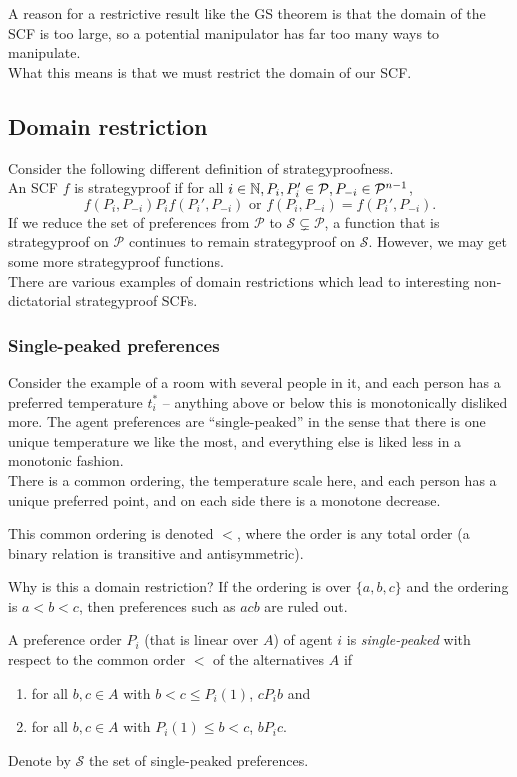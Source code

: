 	A reason for a restrictive result like the GS theorem is that the domain of the SCF is too large, so a potential manipulator has far too many ways to manipulate.\\
	What this means is that we must restrict the domain of our SCF.

\subsection{Domain restriction}

	Consider the following different definition of strategyproofness.\\
	An SCF $f$ is strategyproof if for all $i \in \mathbb{N}, P_i,P_i' \in \mathcal{P}, P_{-i} \in \mathcal{P}^{n-1}$,
	\[ f(P_i,P_{-i}) P_i f(P_i',P_{-i}) \text{ or } f(P_i,P_{-i}) = f(P_i',P_{-i}). \]
	If we reduce the set of preferences from $\mathcal{P}$ to $\mathcal{S} \subsetneq \mathcal{P}$, a function that is strategyproof on $\mathcal{P}$ continues to remain strategyproof on $\mathcal{S}$. However, we may get some more strategyproof functions.\\

	There are various examples of domain restrictions which lead to interesting non-dictatorial strategyproof SCFs.

	\subsubsection{Single-peaked preferences}
		Consider the example of a room with several people in it, and each person has a preferred temperature $t_i^*$ -- anything above or below this is monotonically disliked more. The agent preferences are ``single-peaked'' in the sense that there is one unique temperature we like the most, and everything else is liked less in a monotonic fashion.\\
		There is a common ordering, the temperature scale here, and each person has a unique preferred point, and on each side there is a monotone decrease. %

		This common ordering is denoted $<$, where the order is any total order (a binary relation is transitive and antisymmetric).

		Why is this a domain restriction? If the ordering is over $\{a,b,c\}$ and the ordering is $a<b<c$, then preferences such as $acb$ are ruled out.

		\begin{fdef}
			A preference order $P_i$ (that is linear over $A$) of agent $i$ is \emph{single-peaked} with respect to the common order $<$ of the alternatives $A$ if
			\begin{enumerate}
				\item for all $b,c \in A$ with $b < c \le P_i(1)$, $c P_i b$ and
				\item for all $b,c \in A$ with $P_i(1) \le b < c$, $b P_i c$.
			\end{enumerate}
			Denote by $\mathcal{S}$ the set of single-peaked preferences.
		\end{fdef}

